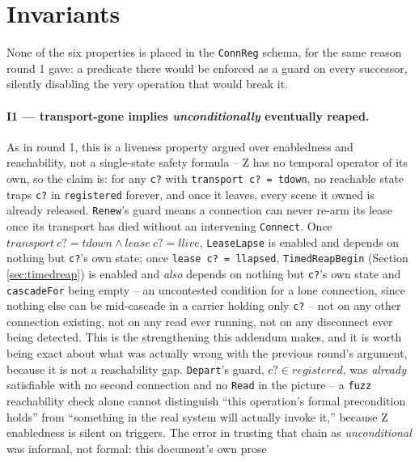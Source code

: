 \documentclass[a4paper,10pt,fleqn]{article}
\begin{document}
\section{Invariants}
\label{sec:inv}

None of the six properties is placed in the \texttt{ConnReg} schema, for
the same reason round 1 gave: a predicate there would be enforced as a
guard on every successor, silently disabling the very operation that
would break it.

\paragraph{I1 --- transport-gone implies \emph{unconditionally} eventually
reaped.}
As in round 1, this is a liveness property argued over enabledness and
reachability, not a single-state safety formula -- Z has no temporal
operator of its own, so the claim is: for any \texttt{c?} with
\texttt{transport~c? = tdown}, no reachable state traps \texttt{c?} in
\texttt{registered} forever, and once it leaves, every scene it owned is
already released. \texttt{Renew}'s guard
means a connection can never re-arm its lease once its transport has died
without an intervening \texttt{Connect}. Once
\texttt{$transport~c? = tdown \land lease~c? = llive$}, \texttt{LeaseLapse}
is enabled and depends on nothing but \texttt{c?}'s own state; once
\texttt{lease~c? = llapsed}, \texttt{TimedReapBegin} (Section
\ref{sec:timedreap}) is enabled and \emph{also} depends on nothing but
\texttt{c?}'s own state and \texttt{cascadeFor} being empty -- an
uncontested condition for a lone connection, since nothing else can be
mid-cascade in a carrier holding only \texttt{c?} -- not on any other
connection existing, not on any read ever running, not on any disconnect
ever being detected. This is
the strengthening this addendum makes, and it is worth being exact about
what was actually wrong with the previous round's argument, because it is
not a reachability gap. \texttt{Depart}'s guard, \texttt{$c? \in
registered$}, was \emph{already} satisfiable with no second connection and
no \texttt{Read} in the picture -- a \texttt{fuzz} reachability check
alone cannot distinguish ``this operation's formal precondition holds''
from ``something in the real system will actually invoke it,'' because Z
enabledness is silent on triggers. The error in trusting that chain as
\emph{unconditional} was informal, not formal: this document's own prose
\end{document}
